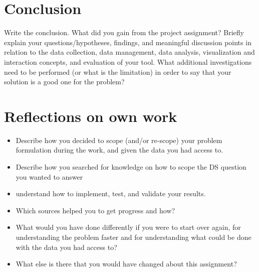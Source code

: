 \section{Conclusion}
\label{chap:conclusion}
Write the conclusion. What did you gain from the project assignment? Briefly explain your questions/hypotheses, findings, and meaningful discussion points in relation to the data collection, data management, data analysis, visualization and interaction concepts, and evaluation of your tool.
What additional investigations need to be performed (or what is the limitation) in order to say that your solution is a good one for the problem? 

\section{Reflections on own work}
\label{chap:reflection}
\begin{itemize}
    \item Describe how you decided to scope (and/or re-scope) your problem formulation during the work, and given the data you had access to.
    \item Describe how you searched for knowledge on how to scope the DS question you wanted to answer 
    \item understand how to implement, test, and validate your results. 
    \item Which sources helped you to get progress and how?
    \item What would you have done differently if you were to start over again, for understanding the problem faster and for understanding what could be done with the data you had access to?
    \item What else is there that you would have changed about this assignment?
\end{itemize}

\newpage